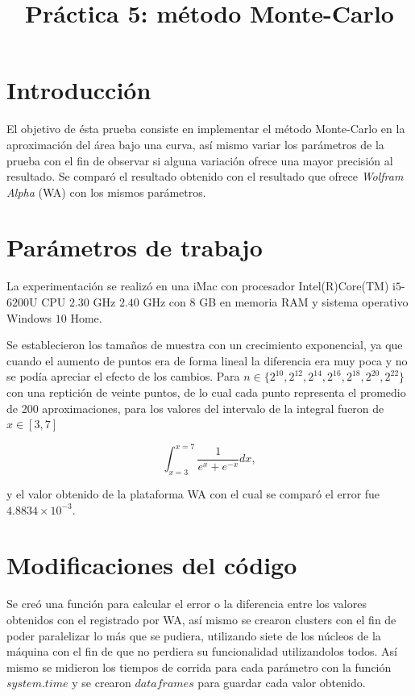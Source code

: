 \documentclass[a4paper]{article}
\title{Práctica 5: método Monte-Carlo}
\begin{document}
\maketitle

\section{Introducci\'on}
El objetivo de ésta prueba consiste en implementar el método Monte-Carlo en la aproximación del área bajo una curva, así mismo variar los parámetros de la prueba con el fin de observar si alguna variación ofrece una mayor precisión al resultado. Se comparó el resultado obtenido con el resultado que ofrece {\em Wolfram Alpha} (WA) con los mismos parámetros.

\section{Par\'ametros de trabajo}
La experimentación se realizó en una iMac con procesador Intel(R)Core(TM) i$5$-$6200$U CPU $2.30$ GHz $2.40$ GHz con $8$ GB en memoria RAM y sistema operativo Windows $10$ Home.

Se establecieron los tamaños de muestra con un crecimiento exponencial, ya que cuando el aumento de puntos era de forma lineal la diferencia era muy poca y no se podía apreciar el efecto de los cambios. Para $n \in \{2^{10},2^{12},2^{14},2^{16},2^{18},2^{20},2^{22}\}$ con una reptición de veinte puntos, de lo cual cada punto representa el promedio de 200 aproximaciones, para los valores del intervalo de la integral fueron de $x \in [3,7]$

\begin{equation}
\int_{x=3}^{x=7} \dfrac{1}{e^x + e^{-x}} dx,
\end{equation}

y el valor obtenido de la plataforma WA con el cual se comparó el error fue $4.8834 \times 10^{-3}$.%
\section{Modificaciones del código}
Se creó una función para calcular el error o la diferencia entre los valores obtenidos con el registrado por WA, así mismo se crearon clusters con el fin de poder paralelizar lo más que se pudiera, utilizando siete de los núcleos de la máquina con el fin de que no perdiera su funcionalidad utilizandolos todos. Así mismo se midieron los tiempos de corrida para cada parámetro con la función $system.time$ y se crearon $data frames$ para guardar cada valor obtenido.
\end{document}
